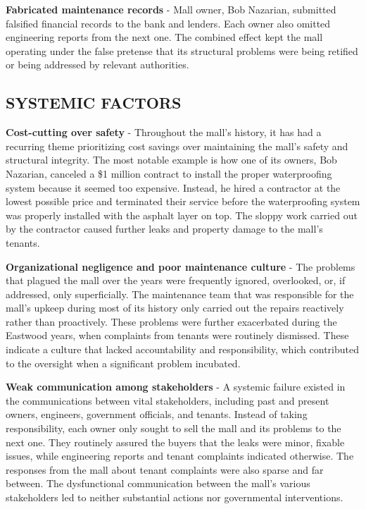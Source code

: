 \documentclass[12pt]{article}
\begin{document}
\textbf{Fabricated maintenance records} - Mall owner, Bob Nazarian, submitted falsified financial records to the bank and lenders. Each owner also omitted engineering reports from the next one. The combined effect kept the mall operating under the false pretense that its structural problems were being retified or being addressed by relevant authorities. 
 

\subsection{SYSTEMIC FACTORS}

\textbf{Cost-cutting over safety} - Throughout the mall's history, it has had a recurring theme prioritizing cost savings over maintaining the mall's safety and structural integrity. The most notable example is how one of its owners, Bob Nazarian, canceled a \$1 million contract to install the proper waterproofing system because it seemed too expensive. Instead, he hired a contractor at the lowest possible price and terminated their service before the waterproofing system was properly installed with the asphalt layer on top. The sloppy work carried out by the contractor caused further leaks and property damage to the mall's tenants.

\textbf{Organizational negligence and poor maintenance culture} - The problems that plagued the mall over the years were frequently ignored, overlooked, or, if addressed, only superficially. The maintenance team that was responsible for the mall's upkeep during most of its history only carried out the repairs reactively rather than proactively. These problems were further exacerbated during the Eastwood years, when complaints from tenants were routinely dismissed. These indicate a culture that lacked accountability and responsibility, which contributed to the oversight when a significant problem incubated.

\textbf{Weak communication among stakeholders} - A systemic failure existed in the communications between vital stakeholders, including past and present owners, engineers, government officials, and tenants. Instead of taking responsibility, each owner only sought to sell the mall and its problems to the next one. They routinely assured the buyers that the leaks were minor, fixable issues, while engineering reports and tenant complaints indicated otherwise. The responses from the mall about tenant complaints were also sparse and far between. The dysfunctional communication between the mall's various stakeholders led to neither substantial actions nor governmental interventions.
\end{document}
